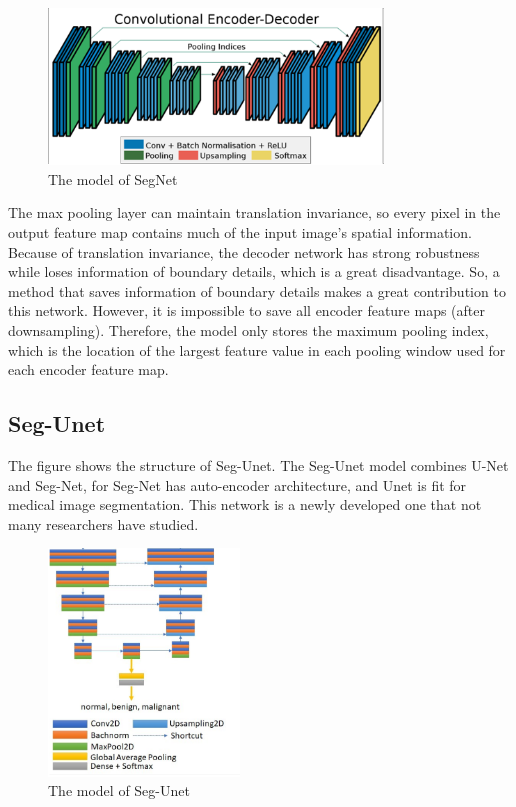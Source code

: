 \documentclass{article}
\begin{document}
\begin{figure}[H]
    \centering
    \includegraphics[width = 3.5in]{SegNet}
    \caption{The model of SegNet}
    \label{The model of SegNet}
\end{figure}

The max pooling layer can maintain translation invariance, so every pixel in the output feature map contains much of the input image's spatial information.
Because of translation invariance, the decoder network has strong robustness while loses information of boundary details, which is a great disadvantage.
So, a method that saves information of boundary details makes a great contribution to this network.
However, it is impossible to save all encoder feature maps (after downsampling).
Therefore, the model only stores the maximum pooling index, which is the location of the largest feature value in each pooling window used for each encoder feature map.

\subsection{Seg-Unet}
The figure shows the structure of Seg-Unet. The Seg-Unet model combines U-Net and Seg-Net, for Seg-Net has auto-encoder architecture, and Unet is fit for medical image segmentation.
This network is a newly developed one that not many researchers have studied.

\begin{figure}[H]
    \centering
    \includegraphics[width = 2.0in]{Seg-Unet}
    \caption{The model of Seg-Unet}
    \label{The model of Seg-Unet}
\end{figure}
\end{document}
